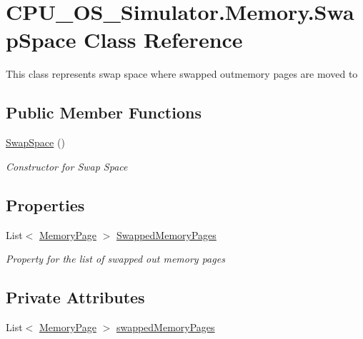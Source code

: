 \hypertarget{class_c_p_u___o_s___simulator_1_1_memory_1_1_swap_space}{}\section{C\+P\+U\+\_\+\+O\+S\+\_\+\+Simulator.\+Memory.\+Swap\+Space Class Reference}
\label{class_c_p_u___o_s___simulator_1_1_memory_1_1_swap_space}


This class represents swap space where swapped outmemory pages are moved to  


\subsection*{Public Member Functions}
\begin{DoxyCompactItemize}
\item 
\hyperlink{class_c_p_u___o_s___simulator_1_1_memory_1_1_swap_space_ad4394dbf2d5a0c95bbabc94948ed37e5}{Swap\+Space} ()
\begin{DoxyCompactList}\small\item\em Constructor for Swap Space \end{DoxyCompactList}\end{DoxyCompactItemize}
\subsection*{Properties}
\begin{DoxyCompactItemize}
\item 
List$<$ \hyperlink{class_c_p_u___o_s___simulator_1_1_memory_1_1_memory_page}{Memory\+Page} $>$ \hyperlink{class_c_p_u___o_s___simulator_1_1_memory_1_1_swap_space_a83c049a398bcff3c29f809b02ed3f782}{Swapped\+Memory\+Pages}
\begin{DoxyCompactList}\small\item\em Property for the list of swapped out memory pages \end{DoxyCompactList}\end{DoxyCompactItemize}
\subsection*{Private Attributes}
\begin{DoxyCompactItemize}
\item 
List$<$ \hyperlink{class_c_p_u___o_s___simulator_1_1_memory_1_1_memory_page}{Memory\+Page} $>$ \hyperlink{class_c_p_u___o_s___simulator_1_1_memory_1_1_swap_space_ad991c315222ab7bf7fafd562d6fe8014}{swapped\+Memory\+Pages}
\end{DoxyCompactItemize}


